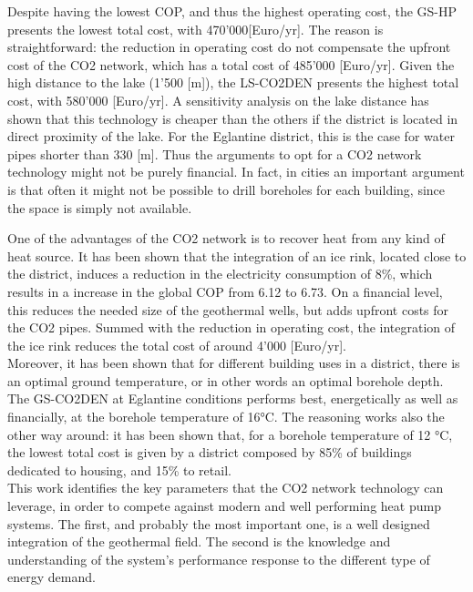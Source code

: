 \documentclass{article}
\begin{document}
Despite having the lowest COP, and thus the highest operating cost, the GS-HP presents the lowest total cost, with 470'000[Euro/yr]. The reason is straightforward: the reduction in operating cost do not compensate the upfront cost of the CO2 network, which has a total cost of 485'000 [Euro/yr]. Given the high distance to the lake (1'500 [m]), the LS-CO2DEN presents the highest total cost, with 580'000 [Euro/yr]. A sensitivity analysis on the lake distance has shown that this technology is cheaper than the others if the district is located in direct proximity of the lake. For the Eglantine district, this is the case for water pipes shorter than 330 [m]. Thus the arguments to opt for a CO2 network technology might not be purely financial. In fact, in cities an important argument is that often it might not be possible to drill boreholes for each building, since the space is simply not available.

One of the advantages of the CO2 network is to recover heat from any kind of heat source. It has been shown that the integration of an ice rink, located close to the district, induces a reduction in the electricity consumption of 8\%, which results in a increase in the global COP from 6.12 to 6.73. On a financial level, this reduces the needed size of the geothermal wells, but adds upfront costs for the CO2 pipes. Summed with the reduction in operating cost, the integration of the ice rink reduces the total cost of around 4'000 [Euro/yr].\\

Moreover, it has been shown that for different building uses in a district, there is an optimal ground temperature, or in other words an optimal borehole depth. The GS-CO2DEN at Eglantine conditions performs best, energetically as well as financially, at the borehole temperature of 16\si{\celsius}. The reasoning works also the other way around: it has been shown that, for a borehole temperature of 12 \si{\celsius}, the lowest total cost is given by a district composed by 85\% of buildings dedicated to housing, and 15\% to retail.\\

This work identifies the key parameters that the CO2 network technology can leverage, in order to compete against modern and well performing heat pump systems. The first, and probably the most important one, is a well designed integration of the geothermal field. The second is the knowledge and understanding of the system's performance response to the different type of energy demand.\\
\end{document}
